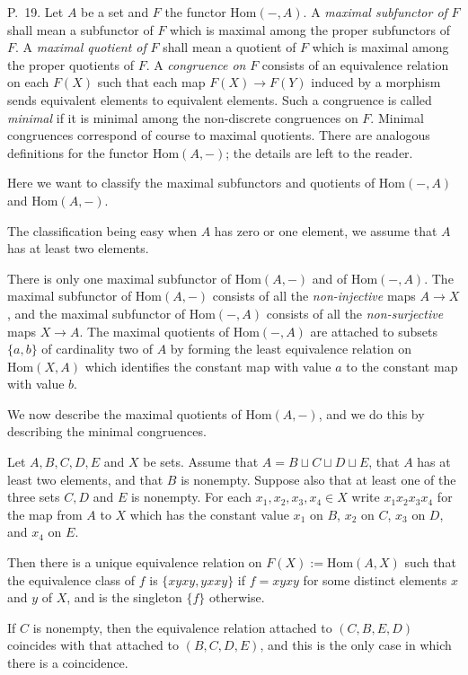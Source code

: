 \documentclass[12pt]{article}
\theoremstyle{remark}
\theoremstyle{definition}
\begin{document}
\begin{s}%
P.~19. Let $A$ be a set and $F$ the functor $\text{Hom}(-,A)$. A \emph{maximal subfunctor of} $F$ shall mean a subfunctor of $F$ which is maximal among the proper subfunctors of $F$. A \emph{maximal quotient of} $F$ shall mean a quotient of $F$ which is maximal among the proper quotients of $F$. A \emph{congruence on} $F$ consists of an equivalence relation on each $F(X)$ such that each map $F(X)\to F(Y)$ induced by a morphism sends equivalent elements to equivalent elements. Such a congruence is called \emph{minimal} if it is minimal among the non-discrete congruences on $F$. Minimal congruences correspond of course to maximal quotients. There are analogous definitions for the functor $\text{Hom}(A,-)$; the details are left to the reader.

Here we want to classify the maximal subfunctors and quotients of $\text{Hom}(-,A)$ and $\text{Hom}(A,-)$.

The classification being easy when $A$ has zero or one element, we assume that $A$ has at least two elements.

There is only one maximal subfunctor of $\text{Hom}(A,-)$ and of $\text{Hom}(-,A)$. The maximal subfunctor of $\text{Hom}(A,-)$ consists of all the \emph{non-injective} maps $A\to X$, and the maximal subfunctor of $\text{Hom}(-,A)$ consists of all the \emph{non-surjective} maps $X\to A$. The maximal quotients of $\text{Hom}(-,A)$ are attached to subsets $\{a,b\}$ of cardinality two of $A$ by forming the least equivalence relation on $\text{Hom}(X,A)$ which identifies the constant map with value $a$ to the constant map with value $b$.

We now describe the maximal quotients of $\text{Hom}(A,-)$, and we do this by describing the minimal congruences.

Let $A,B,C,D,E$ and $X$ be sets. Assume that $A=B\sqcup C\sqcup D\sqcup E$, that $A$ has at least two elements, and that $B$ is nonempty. Suppose also that at least one of the three sets $C,D$ and $E$ is nonempty. For each $x_1,x_2,x_3,x_4\in X$ write $x_1x_2x_3x_4$ for the map from $A$ to $X$ which has the constant value $x_1$ on $B$, $x_2$ on $C$, $x_3$ on $D$, and $x_4$ on $E$. 

Then there is a unique equivalence relation on $F(X):=\text{Hom}(A,X)$ such that the equivalence class of $f$ is $\{xyxy,yxxy\}$ if $f=xyxy$ for some distinct elements $x$ and $y$ of $X$, and is the singleton $\{f\}$ otherwise.

If $C$ is nonempty, then the equivalence relation attached to $(C,B,E,D)$ coincides with that attached to $(B,C,D,E)$, and this is the only case in which there is a coincidence.


\end{s}
\end{document}

